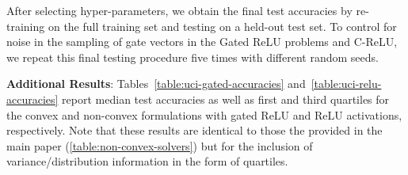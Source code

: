 After selecting hyper-parameters, we obtain the final test accuracies by re-training on the full training set and testing on a held-out test set.
To control for noise in the sampling of gate vectors in the Gated ReLU problems and C-ReLU, we repeat this final testing procedure five times with different random seeds.



\textbf{Additional Results}:
Tables~\ref{table:uci-gated-accuracies} and~\ref{table:uci-relu-accuracies} report median test accuracies as well as first and third quartiles for the convex and non-convex formulations with gated ReLU and ReLU activations, respectively.
Note that these results are identical to those the provided in the main paper (\cref{table:non-convex-solvers}) but for the inclusion of variance/distribution information in the form of quartiles.

